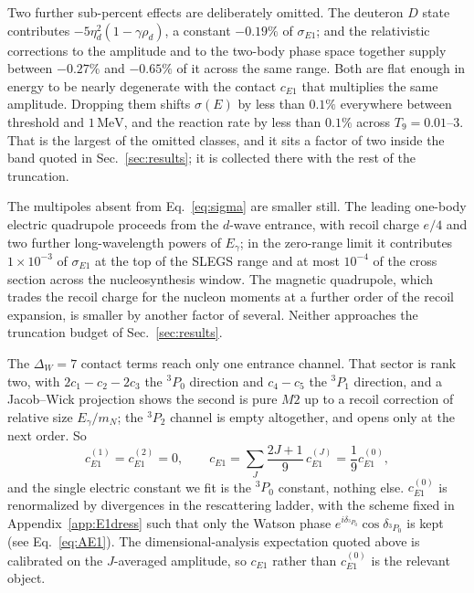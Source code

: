 \documentclass[
  aps,prd,twocolumn,nofootinbib,superscriptaddress,
  longbibliography,floatfix,preprintnumbers
]{revtex4-2}
\newcommand{\Egam}{E_{\gamma}}
\newcommand{\Eone}{E1}
\begin{document}
Two further sub-percent effects are deliberately omitted. The deuteron $D$ state
contributes $-5\eta_{d}^{2}(1-\gamma\rho_{d})$, a constant $-0.19\%$ of $\sigma_{\Eone}$; and the
relativistic corrections to the amplitude and to the two-body phase space
together supply between $-0.27\%$ and $-0.65\%$ of it across the same range. Both are flat enough in energy to be nearly degenerate with the contact
$c_{\Eone}$ that multiplies the same amplitude. Dropping them shifts
$\sigma(E)$ by less than $0.1\%$ everywhere between threshold and
$1\,\mathrm{MeV}$, and the reaction rate by less than $0.1\%$ across
$T_{9}=0.01$--$3$. That is the largest of the omitted classes, and it sits a factor
of two inside the band quoted in Sec.~\ref{sec:results}; it is collected there with
the rest of the truncation.

The multipoles absent from Eq.~\eqref{eq:sigma} are smaller still. The leading
one-body electric quadrupole proceeds from the $d$-wave entrance, with recoil
charge $e/4$ and two further long-wavelength powers of $\Egam$; in the zero-range
limit it contributes $1\times10^{-3}$ of $\sigma_{\Eone}$ at the top of the SLEGS
range and at most $10^{-4}$ of the cross section across the nucleosynthesis
window. The magnetic quadrupole, which trades the recoil charge for the nucleon
moments at a further order of the recoil expansion, is smaller by another factor
of several. Neither approaches the truncation budget of Sec.~\ref{sec:results}.

The $\Delta_{W}=7$ contact terms reach only one entrance channel. That sector is rank two,
with $2c_{1}-c_{2}-2c_{3}$ the $^{3}P_{0}$ direction and $c_{4}-c_{5}$ the
$^{3}P_{1}$ direction, and a Jacob--Wick projection shows the second is pure $M2$ up to a recoil correction of relative size $\Egam/m_{N}$; the $^{3}P_{2}$
channel is empty altogether, and opens only at the next order. So
\begin{equation}
  c_{\Eone}^{(1)}=c_{\Eone}^{(2)}=0,
  \qquad c_{\Eone}=\sum_{J}\frac{2J+1}{9}\,c_{\Eone}^{(J)}=\frac{1}{9}c_{\Eone}^{(0)},
  \label{eq:cE1P0}
\end{equation}
and the single electric constant we fit is the $^{3}P_{0}$ constant, nothing else.
$c_{\Eone}^{(0)}$ is renormalized by divergences in the rescattering ladder, with the scheme fixed in Appendix~\ref{app:E1dress} 
such that only the Watson phase $e^{i\delta_{^{3}P_{0}}}\cos\delta_{^{3}P_{0}}$ is kept (see Eq.~\eqref{eq:AE1}). 
The dimensional-analysis expectation quoted above is calibrated on the $J$-averaged
amplitude, so $c_{\Eone}$ rather than $c_{\Eone}^{(0)}$ is the relevant object. 
\end{document}
